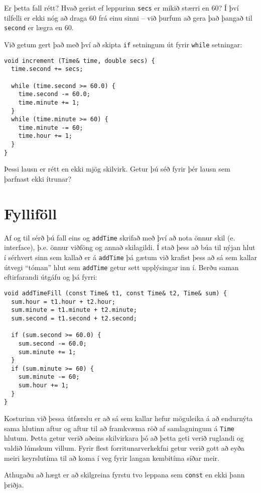 Er þetta fall rétt? Hvað gerist ef leppurinn {\tt secs} er mikið stærri en 60?
Í því tilfelli er ekki nóg að draga 60 frá einu sinni -- við þurfum að gera það þangað til {\tt second} er lægra en 60.

Við getum gert það með því að skipta {\tt if} setningum út fyrir {\tt while} setningar:

\begin{verbatim}
void increment (Time& time, double secs) {
  time.second += secs;

  while (time.second >= 60.0) {
    time.second -= 60.0;
    time.minute += 1;
  }
  while (time.minute >= 60) {
    time.minute -= 60;
    time.hour += 1;
  }
}
\end{verbatim}
%
Þessi lausn er rétt en ekki mjög skilvirk.
Getur þú séð fyrir þér lausn sem þarfnast ekki ítrunar?

\section{Fylliföll}

Af og til sérð þú fall eins og {\tt addTime} skrifað með því að nota önnur skil (e. interface), þ.e. önnur viðföng og annað skilagildi.
Í stað þess að búa til nýjan hlut í sérhvert sinn sem kallað er á {\tt addTime} þá gætum við krafist þess að sá sem kallar útvegi ``tóman'' hlut sem {\tt addTime} getur sett upplýsingar inn í.
Berðu saman eftirfarandi útgáfu og þá fyrri:

\begin{verbatim}
void addTimeFill (const Time& t1, const Time& t2, Time& sum) {
  sum.hour = t1.hour + t2.hour;
  sum.minute = t1.minute + t2.minute;
  sum.second = t1.second + t2.second;

  if (sum.second >= 60.0) {
    sum.second -= 60.0;
    sum.minute += 1;
  }
  if (sum.minute >= 60) {
    sum.minute -= 60;
    sum.hour += 1;
  }
}
\end{verbatim}
%
Kosturinn við þessa útfærslu er að sá sem kallar hefur möguleika á að endurnýta sama hlutinn aftur og aftur til að framkvæma röð af samlagningum á {\tt Time} hlutum.
Þetta getur verið aðeins skilvirkara þó að þetta geti verið ruglandi og valdið lúmskum villum.
Fyrir flest forritunarverkekfni getur verið gott að eyða meiri keyrslutíma til að koma í veg fyrir langan kembitíma síðar meir.

Athugaðu að hægt er að skilgreina fyrstu tvo leppana sem {\tt const} en ekki þann þriðja.

